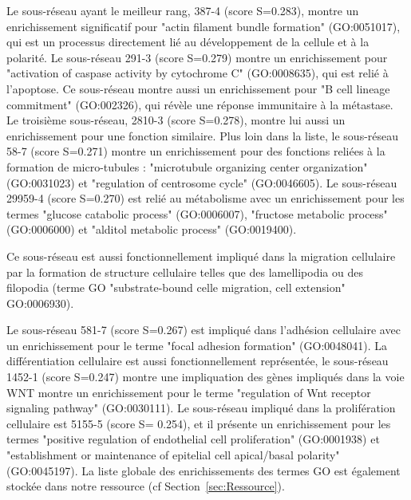 		Le sous-réseau ayant le meilleur rang, 387-4 (score S=0.283), montre un enrichissement significatif pour "actin filament bundle formation" (GO:0051017), qui est un processus directement lié au développement de la cellule et à la polarité.
		Le sous-réseau 291-3 (score S=0.279) montre un enrichissement pour "activation of caspase activity by cytochrome C" (GO:0008635), qui est relié à l'apoptose.
		Ce sous-réseau montre aussi un enrichissement pour "B cell lineage commitment" (GO:002326), qui révèle une réponse immunitaire à la métastase.
		Le troisième sous-réseau, 2810-3 (score S=0.278), montre lui aussi un enrichissement pour une fonction similaire.
		Plus loin dans la liste, le sous-réseau 58-7 (score S=0.271) montre un enrichissement pour des fonctions reliées à la formation de micro-tubules : "microtubule organizing center organization" (GO:0031023) et "regulation of centrosome cycle" (GO:0046605).
		Le sous-réseau 29959-4 (score S=0.270) est relié au métabolisme avec un enrichissement pour les termes "glucose catabolic process" (GO:0006007), "fructose metabolic process" (GO:0006000) et "alditol metabolic process" (GO:0019400).

		\pagebreak
		
		Ce sous-réseau est aussi fonctionnellement impliqué dans la migration cellulaire par la formation de structure cellulaire telles que des lamellipodia ou des filopodia (terme \acs{GO} "substrate-bound celle migration, cell extension" GO:0006930).

		Le sous-réseau 581-7 (score S=0.267) est impliqué dans l'adhésion cellulaire avec un enrichissement pour le terme "focal adhesion formation" (GO:0048041).
		La différentiation cellulaire est aussi fonctionnellement représentée, le sous-réseau 1452-1 (score S=0.247) montre une impliquation des gènes impliqués dans la voie \acs{WNT} montre un enrichissement pour le terme "regulation of Wnt receptor signaling pathway" (GO:0030111).
		Le sous-réseau impliqué dans la prolifération cellulaire est 5155-5 (score S= 0.254), et il présente un enrichissement pour les termes "positive regulation of endothelial cell proliferation" (GO:0001938) et "establishment or maintenance of epitelial cell apical/basal polarity" (GO:0045197).
		La liste globale des enrichissements des termes \acs{GO} est également stockée dans notre ressource (cf Section~\ref{sec:Ressource}).

